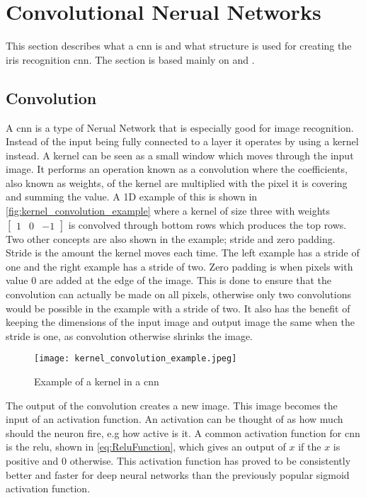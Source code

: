 \section{Convolutional Nerual Networks}
\label{sec:cnn_theory}
This section describes what a \gls{cnn} is and what structure is used for creating the iris recognition \gls{cnn}. The section is based mainly on \cite{Karpathy2016a} and \cite{Nielsen2015}.

\subsection{Convolution}
A \gls{cnn} is a type of Nerual Network that is especially good for image recognition. Instead of the input being fully connected to a layer it operates by using a kernel instead. A kernel can be seen as a small window which moves through the input image. It performs an operation known as a convolution where the coefficients, also known as weights, of the kernel are multiplied with the pixel it is covering and summing the value. A 1D example of this is shown in \autoref{fig:kernel_convolution_example} where a kernel of size three with weights $\begin{bmatrix} 1 & 0 & -1 \end{bmatrix}$ is convolved through bottom rows which produces the top rows. Two other concepts are also shown in the example; stride and zero padding. Stride is the amount the kernel moves each time. The left example has a stride of one and the right example has a stride of two. Zero padding is when pixels with value $0$ are added at the edge of the image. This is done to ensure that the convolution can actually be made on all pixels, otherwise only two convolutions would be possible in the example with a stride of two. It also has the benefit of keeping the dimensions of the input image and output image the same when the stride is one, as convolution otherwise shrinks the image. 

\begin{figure}[h]
	\centering
	\texttt{[image: kernel\_convolution\_example.jpeg]}
	\caption{Example of a kernel in a \gls{cnn} \citep{Karpathy2016a}}
	\label{fig:kernel_convolution_example}
\end{figure}

The output of the convolution creates a new image. This image becomes the input of an activation function. An activation can be thought of as how much should the neuron fire, e.g how active is it. A common activation function for \gls{cnn} is the \gls{relu}, shown in \autoref{eq:ReluFunction}, which gives an output of $x$ if the $x$ is positive and 0 otherwise. This activation function has proved to be consistently better and faster for deep neural networks than the previously popular sigmoid activation function.

